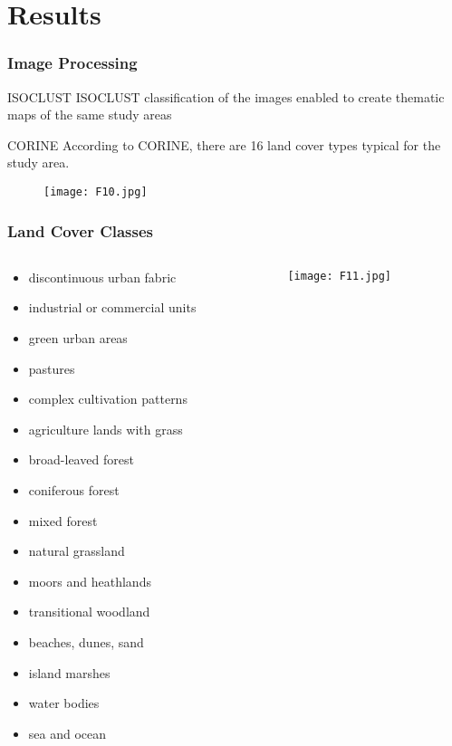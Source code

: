 \documentclass[pdflatex,compress,9pt,
	xcolor={dvipsnames,dvipsnames,svgnames,x11names,table},
	hyperref={colorlinks = true,breaklinks = true, urlcolor = NavyBlue, breaklinks = true}]{beamer}
\begin{document}
\section{Results}
\begin{frame}\frametitle{Image Processing}

\begin{block}{ISOCLUST}
ISOCLUST classification of the images enabled to create thematic maps of the same study areas
\end{block}

\begin{block}{CORINE}
According to CORINE, there are 16 land cover types typical for the study area.
\end{block}

\begin{figure}[H]
	\centering
		\texttt{[image: F10.jpg]}
\end{figure}
\end{frame}

\begin{frame}\frametitle{Land Cover Classes}
\begin{minipage}[0.4\textheight]{\textwidth}
\begin{columns}[T]
\begin{column}{0.5\textwidth}
\small{\begin{itemize}
	\item discontinuous urban fabric
	\item industrial or commercial units
	\item green urban areas
	\item pastures
	\item complex cultivation patterns
	\item agriculture lands with grass
	\item broad-leaved forest
	\item coniferous forest
	\item mixed forest
	\item natural grassland
	\item moors and heathlands
	\item transitional woodland
	\item beaches, dunes, sand
	\item island marshes
	\item water bodies
	\item sea and ocean
\end{itemize}}
\end{column}
\begin{column}{0.5\textwidth}
\begin{figure}[H]
	\centering
		\texttt{[image: F11.jpg]}
\end{figure}
\end{column}
\end{columns}
\end{minipage}
\end{frame}
\end{document}
